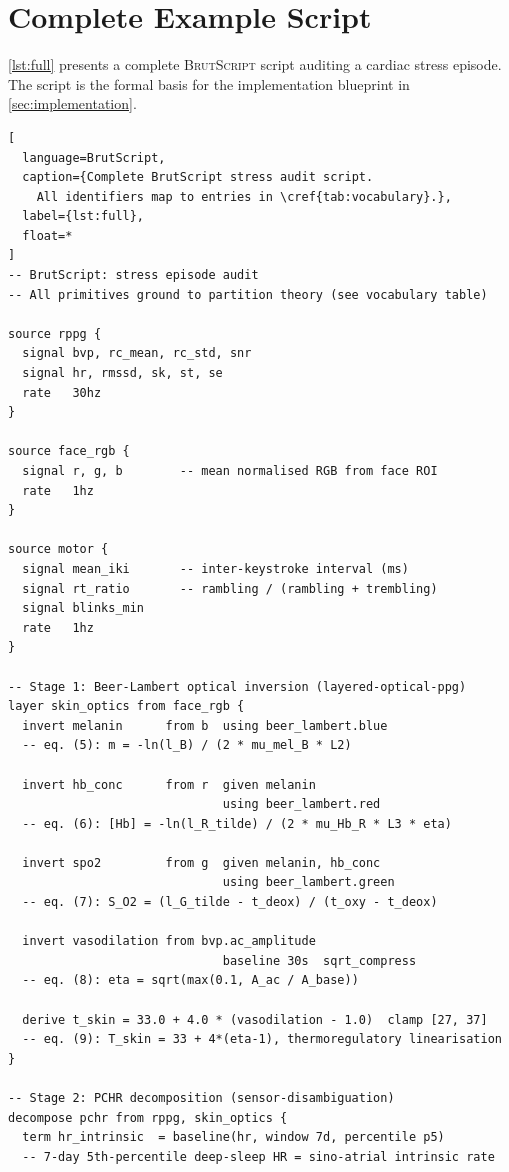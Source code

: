 \documentclass[10pt,twocolumn,a4paper]{article}
\theoremstyle{definition}
\theoremstyle{remark}
\newcommand{\BS}{\textsc{BrutScript}}
\begin{document}
\section{Complete Example Script}
\label{sec:example}

\cref{lst:full} presents a complete \BS{} script auditing a
cardiac stress episode.  The script is the formal basis for the
implementation blueprint in \cref{sec:implementation}.

\begin{lstlisting}[
  language=BrutScript,
  caption={Complete BrutScript stress audit script.
    All identifiers map to entries in \cref{tab:vocabulary}.},
  label={lst:full},
  float=*
]
-- BrutScript: stress episode audit
-- All primitives ground to partition theory (see vocabulary table)

source rppg {
  signal bvp, rc_mean, rc_std, snr
  signal hr, rmssd, sk, st, se
  rate   30hz
}

source face_rgb {
  signal r, g, b        -- mean normalised RGB from face ROI
  rate   1hz
}

source motor {
  signal mean_iki       -- inter-keystroke interval (ms)
  signal rt_ratio       -- rambling / (rambling + trembling)
  signal blinks_min
  rate   1hz
}

-- Stage 1: Beer-Lambert optical inversion (layered-optical-ppg)
layer skin_optics from face_rgb {
  invert melanin      from b  using beer_lambert.blue
  -- eq. (5): m = -ln(l_B) / (2 * mu_mel_B * L2)

  invert hb_conc      from r  given melanin
                              using beer_lambert.red
  -- eq. (6): [Hb] = -ln(l_R_tilde) / (2 * mu_Hb_R * L3 * eta)

  invert spo2         from g  given melanin, hb_conc
                              using beer_lambert.green
  -- eq. (7): S_O2 = (l_G_tilde - t_deox) / (t_oxy - t_deox)

  invert vasodilation from bvp.ac_amplitude
                              baseline 30s  sqrt_compress
  -- eq. (8): eta = sqrt(max(0.1, A_ac / A_base))

  derive t_skin = 33.0 + 4.0 * (vasodilation - 1.0)  clamp [27, 37]
  -- eq. (9): T_skin = 33 + 4*(eta-1), thermoregulatory linearisation
}

-- Stage 2: PCHR decomposition (sensor-disambiguation)
decompose pchr from rppg, skin_optics {
  term hr_intrinsic  = baseline(hr, window 7d, percentile p5)
  -- 7-day 5th-percentile deep-sleep HR = sino-atrial intrinsic rate


\end{lstlisting}
\end{document}
